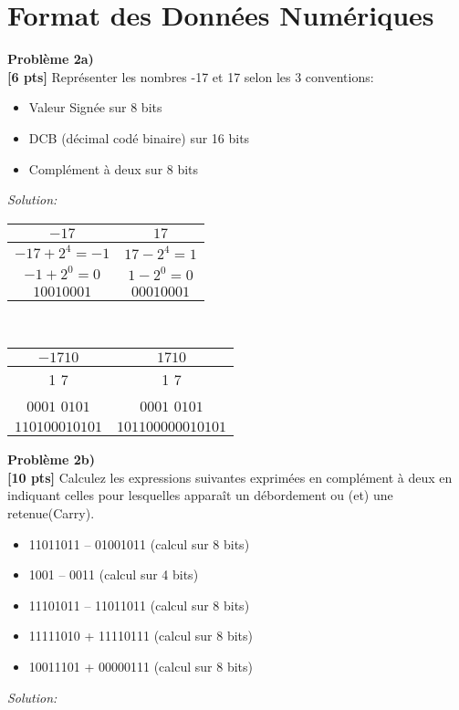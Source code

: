 \documentclass{article}
\newenvironment{problem}[2][Problème]
    { \begin{mdframed}[backgroundcolor=gray!20] \textbf{#1 #2} \\}
    {  \end{mdframed}}
\newenvironment{solution}
    {\textit{Solution:}}
    {}
\begin{document}
\section{Format des Données Numériques}

\begin{problem}{2a)}
\textbf{[6 pts]} Représenter les nombres -17 et 17 selon les 3 conventions:
    \begin{itemize}
        \item Valeur Signée sur 8 bits
        \item DCB (décimal codé binaire) sur 16 bits
        \item Complément à deux sur 8 bits
    \end{itemize}
\end{problem}

\begin{solution}
    \begin{tabular}{c|c}
        $-17$ & $17$\\
        \hline
        $-17+2^4 = -1$ & $17-2^4 = 1$\\
        $-1+2^0=0$&$1-2^0=0$\\
        $10010001$&$00010001$
    \end{tabular}
    \\
    \begin{tabular}[20pt]{c|c}
        $-1710$ & $1710$\\
        \hline
        1 \hspace{12pt} 7 \hspace{12pt}&1 \hspace{12pt} 7\\
        $0001$ $0101$ &$0001$ $0101$\\
        $110100010101$& $101100000010101$
    \end{tabular}
\end{solution}

\newpage
\begin{problem}{2b)}
\textbf{[10 pts]} Calculez les expressions suivantes exprimées en complément à deux en indiquant
celles pour lesquelles apparaît un débordement ou (et) une retenue(Carry).
\begin{itemize}
        \item 11011011 – 01001011 (calcul sur 8 bits)
        \item 1001 – 0011 (calcul sur 4 bits)
        \item 11101011 – 11011011 (calcul sur 8 bits)
        \item 11111010 + 11110111 (calcul sur 8 bits)
        \item 10011101 + 00000111 (calcul sur 8 bits)
    \end{itemize}
\end{problem}
\begin{solution}
    








\end{solution}
\end{document}

